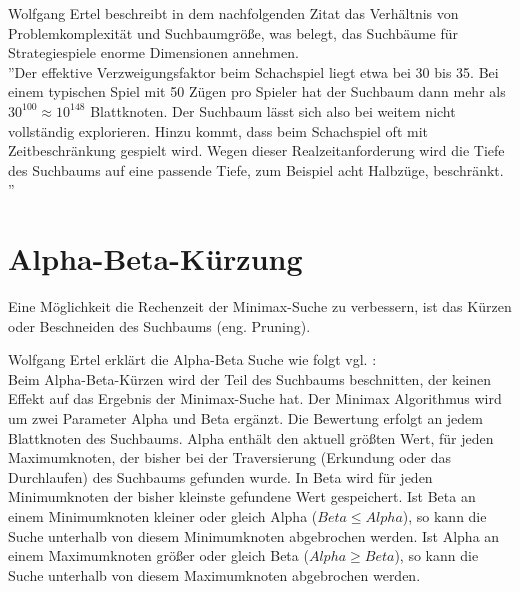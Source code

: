 Wolfgang Ertel beschreibt in dem nachfolgenden Zitat das Verhältnis von Problemkomplexität und Suchbaumgröße, was belegt, das Suchbäume für Strategiespiele enorme Dimensionen annehmen.\\

''Der effektive Verzweigungsfaktor beim Schachspiel liegt etwa bei 30 bis 35. Bei einem typischen Spiel mit 50 Zügen pro Spieler hat der Suchbaum dann mehr als $30^{100} \approx 10^{148}$ Blattknoten. Der Suchbaum lässt sich also bei weitem nicht vollständig explorieren. Hinzu kommt, dass beim Schachspiel oft mit Zeitbeschränkung gespielt wird. Wegen dieser Realzeitanforderung wird die Tiefe des Suchbaums auf eine passende Tiefe, zum Beispiel acht Halbzüge, beschränkt. \cite[114 \psq]{Ertel}'' \\
\newpage

\section{Alpha-Beta-Kürzung}
\label{sec:Alpha-Beta-Kürzung}
Eine Möglichkeit die Rechenzeit der Minimax-Suche zu verbessern, ist das Kürzen oder Beschneiden des Suchbaums (eng. Pruning). 

Wolfgang Ertel erklärt die Alpha-Beta Suche wie folgt vgl. \cite[116]{Ertel}:\\
Beim Alpha-Beta-Kürzen wird der Teil des Suchbaums beschnitten, der keinen Effekt auf das Ergebnis der Minimax-Suche hat. Der Minimax Algorithmus wird um zwei Parameter Alpha und Beta ergänzt. Die Bewertung erfolgt an jedem Blattknoten des Suchbaums. Alpha enthält den aktuell größten Wert, für jeden Maximumknoten, der bisher bei der Traversierung (Erkundung oder das Durchlaufen) des Suchbaums gefunden wurde. In Beta wird für jeden Minimumknoten der bisher kleinste gefundene Wert gespeichert. Ist Beta an einem Minimumknoten kleiner oder gleich Alpha ($Beta \leq Alpha$), so kann die Suche unterhalb von diesem Minimumknoten abgebrochen werden. Ist Alpha an einem Maximumknoten größer oder gleich Beta ($Alpha \geq Beta$), so kann die Suche unterhalb von diesem Maximumknoten abgebrochen werden. \\

